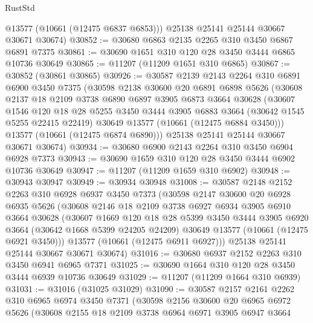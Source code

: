 \begin{lexlean}{RustStd}
\begin{coremodule}
        @13577
        (@10661 (@12475 @6837 @6853)))
      @25138
      @25141
      @25144
      @30667
      @30671
      @30674)
@30852 := @30680 @6863 @2135 @2265 @310 @3450 @6867 @6891 @7375
@30861 := @30690 @1651 @310 @120 @28 @3450 @3444 @6865 @10736 @30649
@30865 := @11207 (@11209 @1651 @310 @6865)
@30867 := @30852 (@30861 @30865)
@30926 := @30587
    @2139
    @2143
    @2264
    @310
    @6891
    @6900
    @3450
    @7375
    (@30598
      @2138
      @30600
      @20
      @6891
      @6898
      @5626
      (@30608
        @2137
        @18
        @2109
        @3738
        @6890
        @6897
        @3905
        @6873
        @3664
        @30628
        (@30607
          @1546
          @120
          @18
          @28
          @5255
          @3450
          @3444
          @3905
          @6883
          @3664
          (@30642 @1545 @5255 @22415 @22419)
          @30649
          @13577
          (@10661 (@12475 @6884 @3450)))
        @13577
        (@10661 (@12475 @6874 @6890)))
      @25138
      @25141
      @25144
      @30667
      @30671
      @30674)
@30934 := @30680 @6900 @2143 @2264 @310 @3450 @6904 @6928 @7373
@30943 := @30690 @1659 @310 @120 @28 @3450 @3444 @6902 @10736 @30649
@30947 := @11207 (@11209 @1659 @310 @6902)
@30948 := @30943 @30947
@30949 := @30934 @30948
@31008 := @30587
    @2148
    @2152
    @2263
    @310
    @6928
    @6937
    @3450
    @7373
    (@30598
      @2147
      @30600
      @20
      @6928
      @6935
      @5626
      (@30608
        @2146
        @18
        @2109
        @3738
        @6927
        @6934
        @3905
        @6910
        @3664
        @30628
        (@30607
          @1669
          @120
          @18
          @28
          @5399
          @3450
          @3444
          @3905
          @6920
          @3664
          (@30642 @1668 @5399 @24205 @24209)
          @30649
          @13577
          (@10661 (@12475 @6921 @3450)))
        @13577
        (@10661 (@12475 @6911 @6927)))
      @25138
      @25141
      @25144
      @30667
      @30671
      @30674)
@31016 := @30680 @6937 @2152 @2263 @310 @3450 @6941 @6965 @7371
@31025 := @30690 @1664 @310 @120 @28 @3450 @3444 @6939 @10736 @30649
@31029 := @11207 (@11209 @1664 @310 @6939)
@31031 := @31016 (@31025 @31029)
@31090 := @30587
    @2157
    @2161
    @2262
    @310
    @6965
    @6974
    @3450
    @7371
    (@30598
      @2156
      @30600
      @20
      @6965
      @6972
      @5626
      (@30608
        @2155
        @18
        @2109
        @3738
        @6964
        @6971
        @3905
        @6947
        @3664

\end{coremodule}
\end{lexlean}
